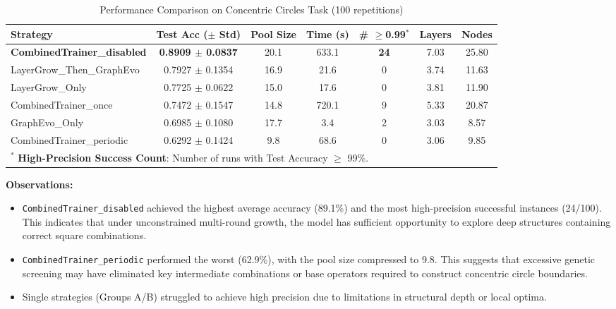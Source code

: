 \begin{table}[htbp]
\centering
\small %
\setlength{\tabcolsep}{3pt} %
\caption{Performance Comparison on Concentric Circles Task (100 repetitions)}
\label{tab:exp_circles}
\begin{tabular}{l c c c c c c}
\toprule
\textbf{Strategy} & \textbf{Test Acc ($\pm$ Std)} & \textbf{Pool Size} & \textbf{Time (s)} & \textbf{\# $\geq$0.99$^*$} & \textbf{Layers} & \textbf{Nodes} \\
\midrule
\textbf{CombinedTrainer\_disabled} & \textbf{0.8909 $\pm$ 0.0837} & 20.1 & 633.1 & \textbf{24} & 7.03 & 25.80 \\
LayerGrow\_Then\_GraphEvo & 0.7927 $\pm$ 0.1354 & 16.9 & 21.6 & 0 & 3.74 & 11.63 \\
LayerGrow\_Only & 0.7725 $\pm$ 0.0622 & 15.0 & 17.6 & 0 & 3.81 & 11.90 \\
CombinedTrainer\_once & 0.7472 $\pm$ 0.1547 & 14.8 & 720.1 & 9 & 5.33 & 20.87 \\
GraphEvo\_Only & 0.6985 $\pm$ 0.1080 & 17.7 & 3.4 & 2 & 3.03 & 8.57 \\
CombinedTrainer\_periodic & 0.6292 $\pm$ 0.1424 & 9.8 & 68.6 & 0 & 3.06 & 9.85 \\
\bottomrule
\multicolumn{7}{l}{\footnotesize $^*$ \textbf{High-Precision Success Count}: Number of runs with Test Accuracy $\geq$ 99\%.}
\end{tabular}
\end{table}

\textbf{Observations:}
\begin{itemize}
    \item \texttt{CombinedTrainer\_disabled} achieved the highest average accuracy (89.1\%) and the most high-precision successful instances (24/100). This indicates that under unconstrained multi-round growth, the model has sufficient opportunity to explore deep structures containing correct square combinations.
    \item \texttt{CombinedTrainer\_periodic} performed the worst (62.9\%), with the pool size compressed to 9.8. This suggests that excessive genetic screening may have eliminated key intermediate combinations or base operators required to construct concentric circle boundaries.
    \item Single strategies (Groups A/B) struggled to achieve high precision due to limitations in structural depth or local optima.
\end{itemize}

